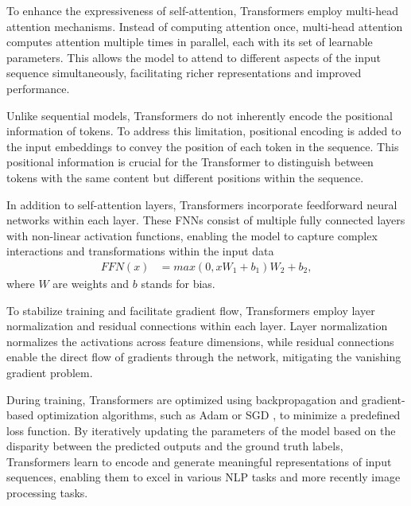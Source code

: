 To enhance the expressiveness of self-attention, Transformers employ multi-head attention mechanisms. Instead of computing attention once, multi-head attention computes attention multiple times in parallel, each with its set of learnable parameters. This allows the model to attend to different aspects of the input sequence simultaneously, facilitating richer representations and improved performance.

Unlike sequential models, Transformers do not inherently encode the positional information of tokens. To address this limitation, positional encoding is added to the input embeddings to convey the position of each token in the sequence. This positional information is crucial for the Transformer to distinguish between tokens with the same content but different positions within the sequence.

In addition to self-attention layers, Transformers incorporate feedforward neural networks within each layer. These FNNs consist of multiple fully connected layers with non-linear activation functions, enabling the model to capture complex interactions and transformations within the input data
\begin{align}
  FFN(x) &= max(0, xW_1 + b_1)W_2 + b_2,
\end{align}
where $W$ are weights and $b$ stands for bias.

To stabilize training and facilitate gradient flow, Transformers employ layer normalization and residual connections within each layer. Layer normalization normalizes the activations across feature dimensions, while residual connections enable the direct flow of gradients through the network, mitigating the vanishing gradient problem.

During training, Transformers are optimized using backpropagation and gradient-based optimization algorithms, such as
Adam \cite{kingma2017adam} or SGD \cite{rakhlin2012making}, to minimize a predefined loss function. By iteratively updating the
parameters of the model based on
the disparity between the predicted outputs and the ground truth labels, Transformers learn to encode and generate
meaningful representations of input sequences, enabling them to excel in various NLP tasks and more recently
image processing tasks.




